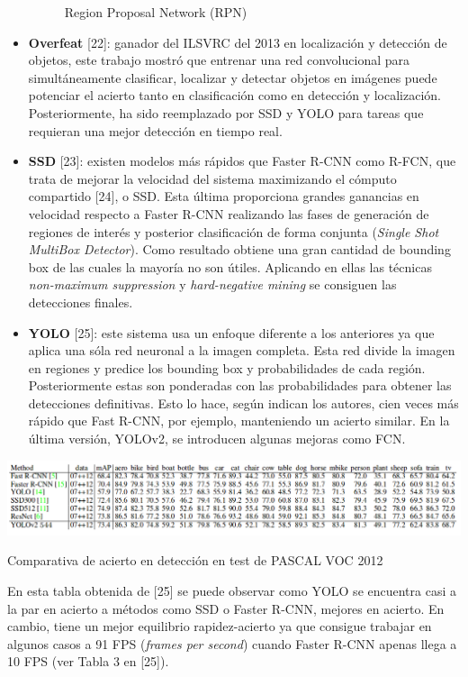 \documentclass{bmvc2k}
\begin{document}
\begin{itemize}
\begin{figure}[h!]
\begin{center}
\caption{Region Proposal Network (RPN)}
\label{fig:fasterrcnn}
\end{center}
\end{figure}
\item \textbf{Overfeat} [22]: ganador del ILSVRC del 2013 en localización y detección de objetos, este trabajo mostró que entrenar una red convolucional para simultáneamente clasificar, localizar y detectar objetos en imágenes puede potenciar el acierto tanto en clasificación como en detección y localización. Posteriormente, ha sido reemplazado por SSD y YOLO para tareas que requieran una mejor detección en tiempo real.
\item \textbf{SSD} [23]: existen modelos más rápidos que Faster R-CNN como R-FCN, que trata de mejorar la velocidad del sistema maximizando el cómputo compartido [24], o SSD. Esta última proporciona grandes ganancias en velocidad respecto a Faster R-CNN realizando las fases de generación de regiones de interés y posterior clasificación de forma conjunta (\textit{Single Shot MultiBox Detector}). Como resultado obtiene una gran cantidad de bounding box de las cuales la mayoría no son útiles. Aplicando en ellas las técnicas \textit{non-maximum suppression} y \textit{hard-negative mining} se consiguen las detecciones finales.
\item \textbf{YOLO} [25]: este sistema usa un enfoque diferente a los anteriores ya que aplica una sóla red neuronal a la imagen completa. Esta red divide la imagen en regiones y predice los bounding box y probabilidades de cada región. Posteriormente estas son ponderadas con las probabilidades para obtener las detecciones definitivas. Esto lo hace, según indican los autores, cien veces más rápido que Fast R-CNN, por ejemplo, manteniendo un acierto similar. En la última versión, YOLOv2, se introducen algunas mejoras como FCN.
\end{itemize}
\begin{table}
\begin{center}
\includegraphics[scale=0.35]{yolo_results_pascal12.png}
\caption{Comparativa de acierto en detección en test de PASCAL VOC 2012}
\end{center}
\end{table}
En esta tabla obtenida de [25] se puede observar como YOLO se encuentra casi a la par en acierto a métodos como SSD o Faster R-CNN, mejores en acierto. En cambio, tiene un mejor equilibrio rapidez-acierto ya que consigue trabajar en algunos casos a 91 FPS (\textit{frames per second}) cuando Faster R-CNN apenas llega a 10 FPS (ver Tabla 3 en [25]).
\end{document}
